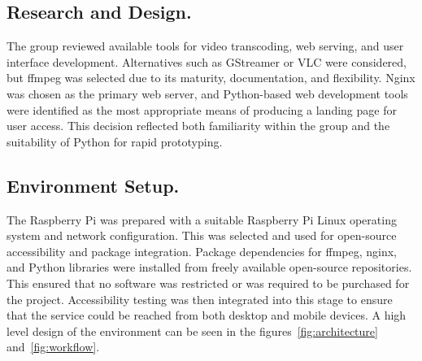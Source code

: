 \documentclass[11pt]{article}
\begin{document}
\subsection{Research and Design.} The group reviewed available tools for video transcoding, web serving, and user interface development. Alternatives such as GStreamer or VLC were considered, but ffmpeg was selected due to its maturity, documentation, and flexibility. Nginx was chosen as the primary web server, and Python-based web development tools were identified as the most appropriate means of producing a landing page for user access. This decision reflected both familiarity within the group and the suitability of Python for rapid prototyping.

\subsection{Environment Setup.} The Raspberry Pi was prepared with a suitable Raspberry Pi Linux operating system and network configuration. This was selected and used for open-source accessibility and package integration. Package dependencies for ffmpeg, nginx, and Python libraries were installed from freely available open-source repositories. This ensured that no software was restricted or was required to be purchased for the project. Accessibility testing was then integrated into this stage to ensure that the service could be reached from both desktop and mobile devices. A high level design of the environment can be seen in the figures~\ref{fig:architecture} and~\ref{fig:workflow}.



\end{document}
